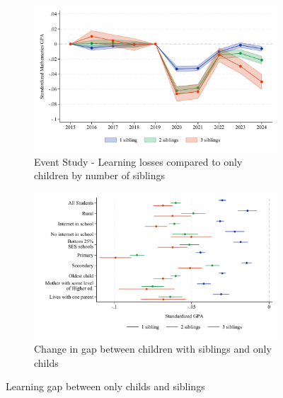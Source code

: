 \begin{figure}[htbp]
    \centering
    
    \begin{subfigure}{\textwidth}
        \centering
        \includegraphics[width=\textwidth]{./FIGURES/Event Study/covid_event_bysibs_all_all_std_gpa_m_adj_Tsiblings_Soldest_4.pdf}
        \caption{Event Study - Learning losses compared to only children by number of siblings}
        \label{fig:main_result_event}
    \end{subfigure}
    
    \vspace{1em} %
    
    \begin{subfigure}{\textwidth}
        \centering
        \includegraphics[width=\textwidth]{./FIGURES/TWFE/covid_twfe_summ_bysibs_all_20-21_gpa_m_adj_Tsiblings_Soldest_4.pdf}
        \caption{Change in gap between children with siblings and only childs}
        \label{fig:main_result_twfe}
    \end{subfigure}
    
    \caption{Learning gap between only childs and siblings}
    \label{fig:main_result}
\end{figure}


